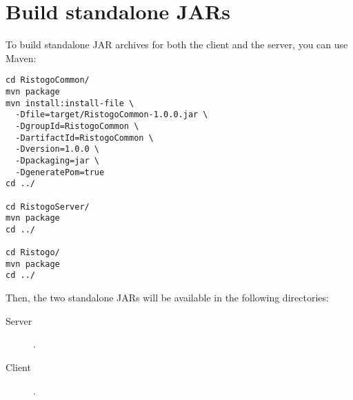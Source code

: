 \section{Build standalone JARs}

To build standalone JAR archives for both the client and the server, you can use
Maven:

\begin{verbatim}
cd RistogoCommon/
mvn package
mvn install:install-file \
  -Dfile=target/RistogoCommon-1.0.0.jar \
  -DgroupId=RistogoCommon \
  -DartifactId=RistogoCommon \
  -Dversion=1.0.0 \
  -Dpackaging=jar \
  -DgeneratePom=true
cd ../

cd RistogoServer/
mvn package
cd ../

cd Ristogo/
mvn package
cd ../
\end{verbatim}

Then, the two standalone JARs will be available in the following directories:

\begin{description}
	\item[Server] .
	\item[Client] .
\end{description}
